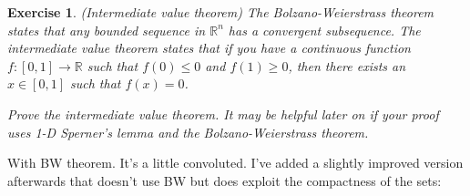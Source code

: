 \documentclass[12pt]{article}
\newtheorem{exercise}{Exercise}
\newcommand{\R}{\mathbb{R}}
\begin{document}
\begin{exercise}
    (Intermediate value theorem) The Bolzano-Weierstrass theorem states that any bounded sequence in $\R^n$ has a convergent subsequence. The intermediate value theorem states that if you have a continuous function $f:[0,1] \to \R$ such that $f(0)\leq0$ and $f(1) \geq 0$, then there exists an $x \in [0,1]$ such that $f(x)=0$.
    
    Prove the intermediate value theorem. It may be helpful later on if your proof uses 1-D Sperner's lemma and the Bolzano-Weierstrass theorem.
\end{exercise}

With BW theorem. It's a little convoluted. I've added a slightly improved version afterwards that doesn't use BW but does exploit the compactness of the sets:
\end{document}
